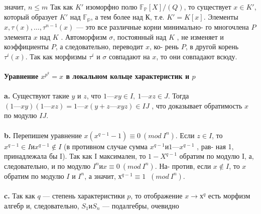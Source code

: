 \pagebreak
\noindent значит, $n \leq m$ Так как $K'$ изоморфно полю $\mathbb{F_P}[X]/(Q)$, то существует\linebreak
$x \in K'$, который образует $K'$ над $\mathbb{F_p}$, а тем более над К, т.е. $K' = K[x].$\linebreak
Элементы $x, \tau(x),\ldots,\tau^{n-1}(x)$ --- это все различные корни минимально-\linebreak
го многочлена $P$ элемента $x$ над $K$ . Автоморфизм $\sigma$, постоянный над
$K$ , не изменяет и коэффициенты $P$, а следовательно, переводит $x$, ко-\linebreak
рень $P$, в другой корень $\tau^{i}(x)$. Так как морфизмы $\tau^{i}$ и $\sigma$ совпадают на\linebreak
$x$, то они совпадают всюду.\\
\\
\noindent\textbf{Уравнение $x^{p^{k}} = x$ в локальном кольце характеристик и $p$}\\
\\
\hspace*{15pt}\textbf{a.} Существуют такие $y$ и $z$, что $1 — xy \in I,~ 1 — xz \in J.$ Тогда\linebreak
$(1 — xy)(1 — xz) = 1 — x(y + z — xyz) \in IJ$ , что доказывает обратимость
$x$ по модулю $I J$.\\
\\
\hspace*{15pt}\textbf{b.} Перепишем уравнение $x(x^{q-1} - 1) \equiv 0 ~(mod~ I^{n})$. Если $z \in I$, то\linebreak
$x^{q-1} \in I и x^{q-1} \notin I$ (в противном случае сумма $x^{q-1} и 1 — x^{q-1}$ , рав-\linebreak
ная 1, принадлежала бы I). Так как I максимален, то $1 - X^{q-1}$ обратим
по модулю I, а, следовательно, и по модулю $I^{n} и x \equiv 0 ~(mod~ I^{n})$. На-\linebreak
против, если $x \notin I$, то $x$ обратим по модулю $I$ и $I^{n}$, а значит, $х^{q-1} \equiv 1$\linebreak
$~(mod~ I^{n})$.\\
\\
\hspace*{15pt}\textbf{c.} Так как $q$ --- степень характеристики $p$, то отображение $x \rightarrow х^{q}$
есть морфизм алгебр и, следовательно, $S_1 и S_n$ --- подалгебры, очевидно
